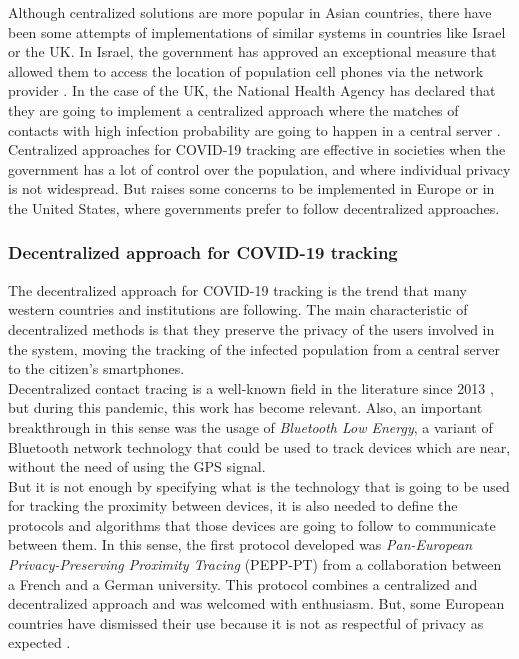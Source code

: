 \documentclass[a4paper, 12pt]{article}
\begin{document}
Although centralized solutions are more popular in Asian countries, there have been some attempts of implementations of similar systems in countries like Israel or the UK. In Israel, the government has approved an exceptional measure that allowed them to access the location of population cell phones via the network provider \cite{israel-covid-tracing}. In the case of the UK, the National Health Agency has declared that they are going to implement a centralized approach where the matches of contacts with high infection probability are going to happen in a central server \cite{uk-tracking}.\\

Centralized approaches for COVID-19 tracking are effective in societies when the government has a lot of control over the population, and where individual privacy is not widespread. But raises some concerns to be implemented in Europe or in the United States, where governments prefer to follow decentralized approaches.

\subsubsection{Decentralized approach for COVID-19 tracking}
\label{subsubsection:decentralized-approach}

The decentralized approach for COVID-19 tracking is the trend that many western countries and institutions are following. The main characteristic of decentralized methods is that they preserve the privacy of the users involved in the system, moving the tracking of the infected population from a central server to the citizen's smartphones. \\

Decentralized contact tracing is a well-known field in the literature since 2013 \cite{bell2020tracesecure}\cite{altuwaiyan2018epic}\cite{zhang2013privacy}, but during this pandemic, this work has become relevant. Also, an important breakthrough in this sense was the usage of \textit{Bluetooth Low Energy}, a variant of Bluetooth network technology that could be used to track devices which are near, without the need of using the GPS signal. \\

But it is not enough by specifying what is the technology that is going to be used for tracking the proximity between devices, it is also needed to define the protocols and algorithms that those devices are going to follow to communicate between them. In this sense, the first protocol developed was \textit{Pan-European Privacy-Preserving Proximity Tracing} (PEPP-PT) \cite{pepppt} from a collaboration between a French and a German university. This protocol combines a centralized and decentralized approach and was welcomed with enthusiasm. But, some European countries have dismissed their use because it is not as respectful of privacy as expected \cite{swiss-peppt}.\\
\end{document}
